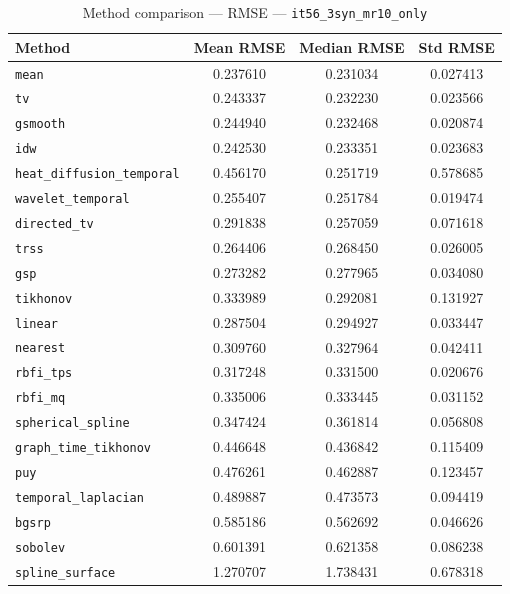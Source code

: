 \begin{table}[ht]
\centering
\caption{Method comparison — RMSE — \texttt{it56_3syn_mr10_only}}
\label{tab:rmse_it56_3syn_mr10_only}
\begin{tabular}{lccc}
\hline
Method & Mean RMSE & Median RMSE & Std RMSE \\
\hline
\texttt{mean} & 0.237610 & 0.231034 & 0.027413 \\
\texttt{tv} & 0.243337 & 0.232230 & 0.023566 \\
\texttt{gsmooth} & 0.244940 & 0.232468 & 0.020874 \\
\texttt{idw} & 0.242530 & 0.233351 & 0.023683 \\
\texttt{heat_diffusion_temporal} & 0.456170 & 0.251719 & 0.578685 \\
\texttt{wavelet_temporal} & 0.255407 & 0.251784 & 0.019474 \\
\texttt{directed_tv} & 0.291838 & 0.257059 & 0.071618 \\
\texttt{trss} & 0.264406 & 0.268450 & 0.026005 \\
\texttt{gsp} & 0.273282 & 0.277965 & 0.034080 \\
\texttt{tikhonov} & 0.333989 & 0.292081 & 0.131927 \\
\texttt{linear} & 0.287504 & 0.294927 & 0.033447 \\
\texttt{nearest} & 0.309760 & 0.327964 & 0.042411 \\
\texttt{rbfi_tps} & 0.317248 & 0.331500 & 0.020676 \\
\texttt{rbfi_mq} & 0.335006 & 0.333445 & 0.031152 \\
\texttt{spherical_spline} & 0.347424 & 0.361814 & 0.056808 \\
\texttt{graph_time_tikhonov} & 0.446648 & 0.436842 & 0.115409 \\
\texttt{puy} & 0.476261 & 0.462887 & 0.123457 \\
\texttt{temporal_laplacian} & 0.489887 & 0.473573 & 0.094419 \\
\texttt{bgsrp} & 0.585186 & 0.562692 & 0.046626 \\
\texttt{sobolev} & 0.601391 & 0.621358 & 0.086238 \\
\texttt{spline_surface} & 1.270707 & 1.738431 & 0.678318 \\
\hline
\end{tabular}
\end{table}
